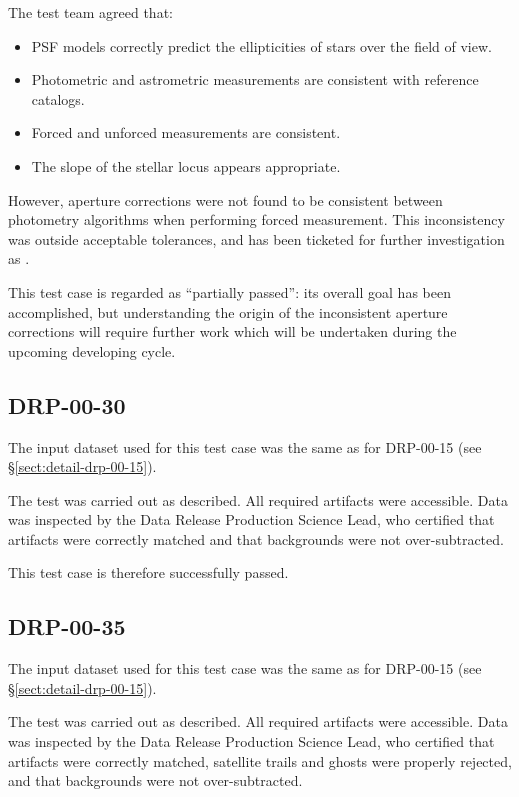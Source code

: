 \documentclass[DM,lsstdraft,STR,toc]{lsstdoc}
\begin{document}
The test team agreed that:

\begin{itemize}

  \item{PSF models correctly predict the ellipticities of stars over the field of view.}
  \item{Photometric and astrometric measurements are consistent with reference catalogs.}
  \item{Forced and unforced measurements are consistent.}
  \item{The slope of the stellar locus appears appropriate.}

\end{itemize}

However, aperture corrections were not found to be consistent between photometry algorithms when performing forced measurement.
This inconsistency was outside acceptable tolerances, and has been ticketed for further investigation as .

This test case is regarded as ``partially passed'': its overall goal has been accomplished, but understanding the origin of the inconsistent aperture corrections will require further work which will be undertaken during the upcoming developing cycle.

\subsection{DRP-00-30}
\label{sect:detail-drp-00-30}

The input dataset used for this test case was the same as for DRP-00-15 (see \S\ref{sect:detail-drp-00-15}).

The test was carried out as described.
All required artifacts were accessible.
Data was inspected by the Data Release Production Science Lead, who certified that artifacts were correctly matched and that backgrounds were not over-subtracted.

This test case is therefore successfully passed.

\subsection{DRP-00-35}
\label{sect:detail-drp-00-35}

The input dataset used for this test case was the same as for DRP-00-15 (see \S\ref{sect:detail-drp-00-15}).

The test was carried out as described.
All required artifacts were accessible.
Data was inspected by the Data Release Production Science Lead, who certified that artifacts were correctly matched, satellite trails and ghosts were properly rejected, and that backgrounds were not over-subtracted.
\end{document}
